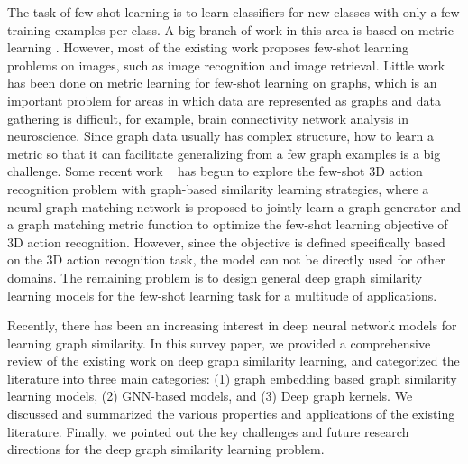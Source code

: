 The task of few-shot learning is to learn classifiers for new classes with only a few training examples per class. A big branch of work in this area is based on metric learning . However, most of the existing work proposes few-shot learning problems on images, such as image recognition  and image retrieval. Little work has been done on metric learning for few-shot learning on graphs, which is an important problem for areas in which data are represented as graphs and data gathering is difficult, for example, brain connectivity network analysis in neuroscience. Since graph data usually has complex structure, how to learn a metric so that it can facilitate generalizing from a few graph examples is a big challenge. Some recent work ~ has begun to explore the few-shot 3D action recognition problem with graph-based similarity learning strategies, where a neural graph matching network is proposed to jointly learn a graph generator and a graph matching metric function to optimize the few-shot learning objective of 3D action recognition. However, since the objective is defined specifically based on the 3D action recognition task, the model can not be directly used for other domains. The remaining problem is to design general deep graph similarity learning models for the few-shot learning task for a multitude of applications.

\label{sec:conc}
Recently, there has been an increasing interest in deep neural network models for learning graph similarity. In this survey paper, we provided a comprehensive review of the existing work on deep graph similarity learning, and categorized the literature into three main categories: (1) graph embedding based graph similarity learning models, (2) GNN-based models, and (3) Deep graph kernels. We discussed and summarized the various properties and applications of the existing literature. Finally, we pointed out the key challenges and future research directions for the deep graph similarity learning problem.

